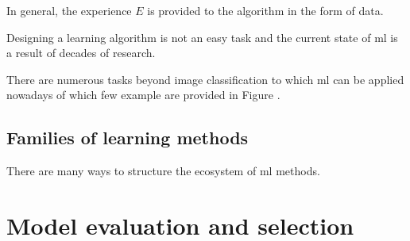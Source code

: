 In general, the experience $E$ is provided to the algorithm in the form of data.

Designing a learning algorithm is not an easy task and the current state of \acrlong{ml} is a result of decades of research. 


There are numerous tasks beyond image classification to which \acrlong{ml} can be applied nowadays of which few example are provided in Figure .    


















\subsection{Families of learning methods}

There are many ways to structure the ecosystem of \acrlong{ml} methods. 


\section{Model evaluation and selection}


